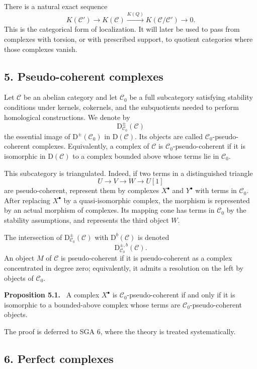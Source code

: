 \documentclass[14pt]{extarticle}
\newcommand{\D}{\mathrm D}
\newcommand{\cC}{\mathcal C}
\newenvironment{statement}[1]{\par\medskip\noindent\textbf{#1.}\ }{\par\medskip}
\begin{document}
There is a natural exact sequence
\[
   K(\cC')\longrightarrow K(\cC)\xrightarrow{K(Q)}K(\cC/\cC')\longrightarrow0.
\]
This is the categorical form of localization. It will later be used to pass from complexes with torsion, or with prescribed support, to quotient categories where those complexes vanish.

\subsection*{5. Pseudo-coherent complexes}

Let $\cC$ be an abelian category and let $\cC_0$ be a full subcategory satisfying stability conditions under kernels, cokernels, and the subquotients needed to perform homological constructions. We denote by
\[
   \D^\pm_{\cC_0}(\cC)
\]
the essential image of $\D^\pm(\cC_0)$ in $\D(\cC)$. Its objects are called $\cC_0$-pseudo-coherent complexes. Equivalently, a complex of $\cC$ is $\cC_0$-pseudo-coherent if it is isomorphic in $\D(\cC)$ to a complex bounded above whose terms lie in $\cC_0$.

This subcategory is triangulated. Indeed, if two terms in a distinguished triangle
\[
   U\to V\to W\to U[1]
\]
are pseudo-coherent, represent them by complexes $X^\bullet$ and $Y^\bullet$ with terms in $\cC_0$. After replacing $X^\bullet$ by a quasi-isomorphic complex, the morphism is represented by an actual morphism of complexes. Its mapping cone has terms in $\cC_0$ by the stability assumptions, and represents the third object $W$.

The intersection of $\D^\pm_{\cC_0}(\cC)$ with $\D^b(\cC)$ is denoted
\[
   \D^{\pm,b}_{\cC_0}(\cC).
\]
An object $M$ of $\cC$ is pseudo-coherent if it is pseudo-coherent as a complex concentrated in degree zero; equivalently, it admits a resolution on the left by objects of $\cC_0$.

\begin{statement}{Proposition 5.1}
A complex $X^\bullet$ is $\cC_0$-pseudo-coherent if and only if it is isomorphic to a bounded-above complex whose terms are $\cC_0$-pseudo-coherent objects.
\end{statement}

The proof is deferred to SGA 6, where the theory is treated systematically.

\subsection*{6. Perfect complexes}
\end{document}
